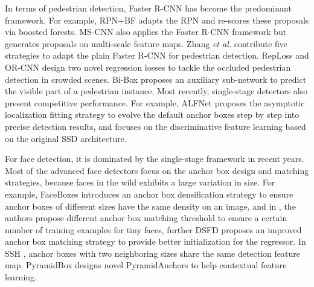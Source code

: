 In terms of pedestrian detection, Faster R-CNN has become the predominant framework. For example, RPN+BF \cite{zhang2016faster} adapts the RPN and re-scores these proposals via boosted forests. MS-CNN \cite{cai2016unified} also applies the Faster R-CNN framework but generates proposals on multi-scale feature maps. Zhang \emph{et al.} \cite{zhang2017citypersons} contribute five strategies to adapt the plain Faster R-CNN for pedestrian detection. RepLoss \cite{wang2017repulsion} and OR-CNN \cite{Zhang_2018_ECCV} design two novel regression losses to tackle the occluded pedestrian detection in crowded scenes. Bi-Box \cite{Zhou_2018_ECCV} proposes an auxiliary sub-network to predict the visible part of a pedestrian instance. Most recently, single-stage detectors also present competitive performance. For example, ALFNet \cite{Liu_2018_ECCV} proposes the asymptotic localization fitting strategy to evolve the default anchor boxes step by step into precise detection results, and \cite{Lin_2018_ECCV} focuses on the discriminative feature learning based on the original SSD architecture.

For face detection, it is dominated by the single-stage framework in recent years. Most of the advanced face detectors focus on the anchor box design and matching strategies, because faces in the wild exhibits a large variation in size. For example, FaceBoxes \cite{zhang2017faceboxes} introduces an anchor box densification strategy to ensure anchor boxes of different sizes have the same density on an image, and in \cite{zhang2017s3fd,zhu2018seeing}, the authors propose different anchor box matching threshold to ensure a certain number of training examples for tiny faces, further DSFD \cite{li2018dsfd} proposes an improved anchor box matching strategy to provide better initialization for the regressor. In SSH \cite{najibi2017ssh}, anchor boxes with two neighboring sizes share the same detection feature map. PyramidBox \cite{Tang_2018_ECCV} designs novel PyramidAnchors to help contextual feature learning.

